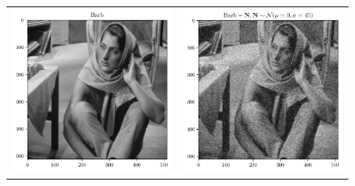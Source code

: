 \documentclass{article}
\begin{document}
\begin{enumerate}
\begin{figure}
{\begin{tabular}{cc}
        \includegraphics{barb} & \includegraphics{0MAGN_barb} \\

\end{tabular}}
\end{figure}
\end{enumerate}
\end{document}
